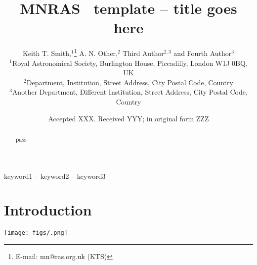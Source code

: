 \documentclass[a4paper,fleqn,usenatbib]{mnras}
\title[Short title, max. 45 characters]{MNRAS \LaTeXe\ template -- title goes here}
\author[K. T. Smith et al.]{
Keith T. Smith,$^{1}$\thanks{E-mail: mn@ras.org.uk (KTS)}
A. N. Other,$^{2}$
Third Author$^{2,3}$
and Fourth Author$^{3}$

$^{1}$Royal Astronomical Society, Burlington House, Piccadilly, London W1J 0BQ, UK\\
$^{2}$Department, Institution, Street Address, City Postal Code, Country\\
$^{3}$Another Department, Different Institution, Street Address, City Postal Code, Country
}
\date{Accepted XXX. Received YYY; in original form ZZZ}
\begin{document}
\label{firstpage}
\pagerange{\pageref{firstpage}--\pageref{lastpage}}
\maketitle

\begin{abstract}
pass
\end{abstract}

\begin{keywords}
keyword1 -- keyword2 -- keyword3
\end{keywords}



\section{Introduction}


\begin{figure*}
   \texttt{[image: figs/.png]}
   \caption{} 
   \label{fig:machine_dist} 
\end{figure*}


\bsp	%
\label{lastpage}
\end{document}
